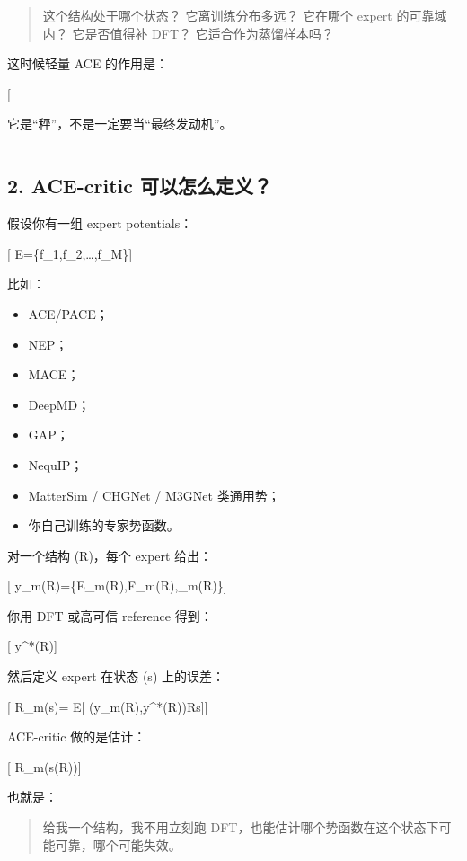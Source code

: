 \documentclass[
  12pt,
]{ctexart}
\providecommand{\tightlist}{%
  \setlength{\itemsep}{0pt}\setlength{\parskip}{0pt}}
\begin{document}
\begin{quote}
这个结构处于哪个状态？ 它离训练分布多远？ 它在哪个 expert 的可靠域内？
它是否值得补 DFT？ 它适合作为蒸馏样本吗？
\end{quote}

这时候轻量 ACE 的作用是：

{[}  \rightarrow {}
\rightarrow \text{error-risk / data-value / expert-routing}{]}

它是``秤''，不是一定要当``最终发动机''。

\begin{center}\rule{0.5\linewidth}{0.5pt}\end{center}

\subsection{2. ACE-critic
可以怎么定义？}\label{ace-critic-ux53efux4ee5ux600eux4e48ux5b9aux4e49}

假设你有一组 expert potentials：

{[} \mathcal E=\{f\_1,f\_2,\dots,f\_M\}{]}

比如：

\begin{itemize}
\tightlist
\item
  ACE/PACE；
\item
  NEP；
\item
  MACE；
\item
  DeepMD；
\item
  GAP；
\item
  NequIP；
\item
  MatterSim / CHGNet / M3GNet 类通用势；
\item
  你自己训练的专家势函数。
\end{itemize}

对一个结构 (R)，每个 expert 给出：

{[} y\_m(R)=\{E\_m(R),F\_m(R),\sigma\_m(R)\}{]}

你用 DFT 或高可信 reference 得到：

{[} y\^{}*(R){]}

然后定义 expert 在状态 (s) 上的误差：

{[} R\_m(s)= \mathbb E{[} \ell(y\_m(R),y\^{}*(R))\mid R\in s{]}{]}

ACE-critic 做的是估计：

{[} \widehat R\_m(s(R)){]}

也就是：

\begin{quote}
给我一个结构，我不用立刻跑
DFT，也能估计哪个势函数在这个状态下可能可靠，哪个可能失效。
\end{quote}
\end{document}
